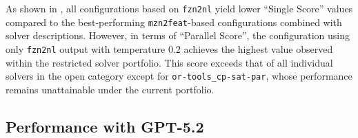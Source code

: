 \documentclass[../../main]{subfiles}
\begin{document}
\begin{table}[ht]
    \centering
    \caption{Sampling-temperature sweep for configurations including \texttt{fzn2nl} output, evaluated with \texttt{gpt-oss-120b}. Columns are computed as in .}
    \label{tab:combinedFznTemp}
\end{table}

As shown in , all configurations based on \texttt{fzn2nl} yield lower ``Single Score'' values compared to the best-performing \texttt{mzn2feat}-based configurations combined with solver descriptions. However, in terms of ``Parallel Score'', the configuration using only \texttt{fzn2nl} output with temperature $0.2$ achieves the highest value observed within the restricted solver portfolio. This score exceeds that of all individual solvers in the open category except for \texttt{or-tools\_cp-sat-par}, whose performance remains unattainable under the current portfolio.

\subsection{Performance with GPT-5.2}
\end{document}
